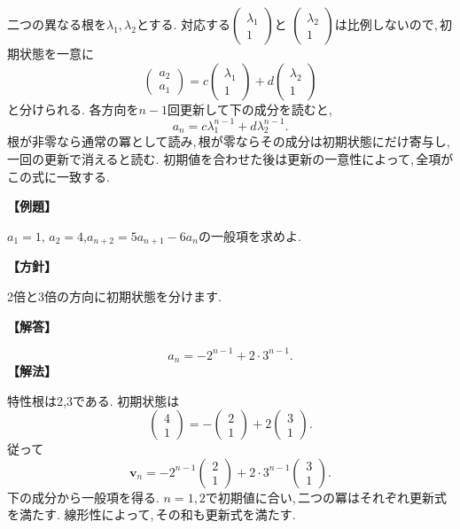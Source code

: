 二つの異なる根を$\lambda_1,\lambda_2$とする.
対応する$\begin{pmatrix}\lambda_1\\1\end{pmatrix}$と
$\begin{pmatrix}\lambda_2\\1\end{pmatrix}$は比例しないので,\,初期状態を一意に
\[
 \begin{pmatrix}a_2\\a_1\end{pmatrix}
 =c\begin{pmatrix}\lambda_1\\1\end{pmatrix}
 +d\begin{pmatrix}\lambda_2\\1\end{pmatrix}
\]
と分けられる.
各方向を$n-1$回更新して下の成分を読むと,
\[
 a_n=c\lambda_1^{n-1}+d\lambda_2^{n-1}.
\]
根が非零なら通常の冪として読み,\,根が零ならその成分は初期状態にだけ寄与し,\,一回の更新で消えると読む.
初期値を合わせた後は更新の一意性によって,\,全項がこの式に一致する.

\noindent\textbf{【例題】}\par\nobreak
$a_1=1,\,a_2=4$,$a_{n+2}=5a_{n+1}-6a_n$の一般項を求めよ.

\noindent\textbf{【方針】}\par\nobreak
2倍と3倍の方向に初期状態を分けます.

\noindent\textbf{【解答】}\par\nobreak
\[
 a_n=-2^{n-1}+2\cdot3^{n-1}.
\]
\noindent\textbf{【解法】}\par\nobreak
特性根は2,3である. 初期状態は
\[
 \begin{pmatrix}4\\1\end{pmatrix}
 =-\begin{pmatrix}2\\1\end{pmatrix}
 +2\begin{pmatrix}3\\1\end{pmatrix}.
\]
従って
\[
 \boldsymbol v_n
 =-2^{n-1}\begin{pmatrix}2\\1\end{pmatrix}
 +2\cdot3^{n-1}\begin{pmatrix}3\\1\end{pmatrix}.
\]
下の成分から一般項を得る.
$n=1,2$で初期値に合い,\,二つの冪はそれぞれ更新式を満たす.
線形性によって,\,その和も更新式を満たす.

